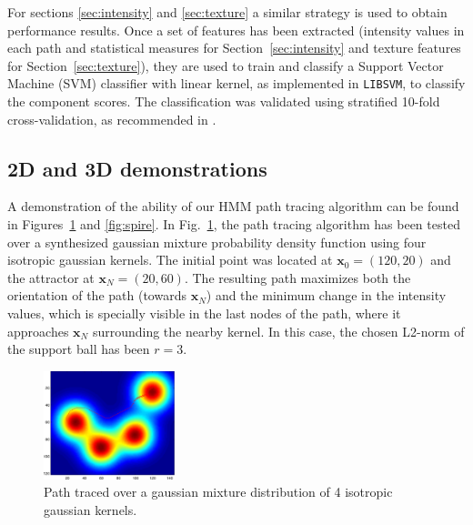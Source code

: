 For sections \ref{sec:intensity} and \ref{sec:texture} a similar strategy is used to obtain performance results. Once a set of features has been extracted (intensity values in each path and statistical measures for Section~\ref{sec:intensity} and texture features for Section~\ref{sec:texture}), they are used to train and classify a Support Vector Machine (SVM) classifier with linear kernel, as implemented in \texttt{LIBSVM}\cite{Chang2001}, to classify the component scores. The classification was validated using stratified 10-fold cross-validation, as recommended in \cite{Kohavi1995a}.

\subsection{2D and 3D demonstrations}\label{sec:demo}
A demonstration of the ability of our \ac{HMM} path tracing algorithm can be found in Figures~\ref{fig:gaussian} and \ref{fig:spire}. In Fig.~\ref{fig:gaussian}, the path tracing algorithm has been tested over a synthesized gaussian mixture probability density function using four isotropic gaussian kernels. The initial point was located at $\mathbf{x}_0 = (120,20)$ and the attractor at $\mathbf{x}_N = (20, 60)$. The resulting path maximizes both the orientation of the path (towards $\mathbf{x}_N$) and the minimum change in the intensity values, which is specially visible in the last nodes of the path, where it approaches $\mathbf{x}_N$ surrounding the nearby kernel. In this case, the chosen L2-norm of the support ball has been $r=3$. 
\begin{figure}
	\begin{center}
		\includegraphics[width=1.5in]{gfx/ch6/gaussian}
		\caption{Path traced over a gaussian mixture distribution of 4 isotropic gaussian kernels.}
		\label{fig:gaussian}
	\end{center}
\end{figure}

